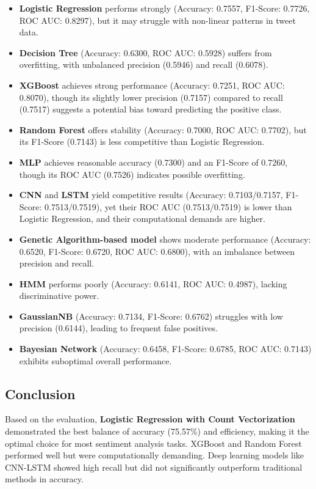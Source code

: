 \begin{itemize}
    \item \textbf{Logistic Regression} performs strongly (Accuracy: 0.7557, F1-Score: 0.7726, ROC AUC: 0.8297), but it may struggle with non-linear patterns in tweet data.
    \item \textbf{Decision Tree} (Accuracy: 0.6300, ROC AUC: 0.5928) suffers from overfitting, with unbalanced precision (0.5946) and recall (0.6078).
    \item \textbf{XGBoost} achieves strong performance (Accuracy: 0.7251, ROC AUC: 0.8070), though its slightly lower precision (0.7157) compared to recall (0.7517) suggests a potential bias toward predicting the positive class.
    \item \textbf{Random Forest} offers stability (Accuracy: 0.7000, ROC AUC: 0.7702), but its F1-Score (0.7143) is less competitive than Logistic Regression.
    \item \textbf{MLP} achieves reasonable accuracy (0.7300) and an F1-Score of 0.7260, though its ROC AUC (0.7526) indicates possible overfitting.
    \item \textbf{CNN} and \textbf{LSTM} yield competitive results (Accuracy: 0.7103/0.7157, F1-Score: 0.7513/0.7519), yet their ROC AUC (0.7513/0.7519) is lower than Logistic Regression, and their computational demands are higher.
    \item \textbf{Genetic Algorithm-based model} shows moderate performance (Accuracy: 0.6520, F1-Score: 0.6720, ROC AUC: 0.6800), with an imbalance between precision and recall.
    \item \textbf{HMM} performs poorly (Accuracy: 0.6141, ROC AUC: 0.4987), lacking discriminative power.
    \item \textbf{GaussianNB} (Accuracy: 0.7134, F1-Score: 0.6762) struggles with low precision (0.6144), leading to frequent false positives.
    \item \textbf{Bayesian Network} (Accuracy: 0.6458, F1-Score: 0.6785, ROC AUC: 0.7143) exhibits suboptimal overall performance.
\end{itemize}

\subsection{Conclusion}

Based on the evaluation, \textbf{Logistic Regression with Count Vectorization} demonstrated the best balance of accuracy (75.57\%) and efficiency, making it the optimal choice for most sentiment analysis tasks. XGBoost and Random Forest performed well but were computationally demanding. Deep learning models like CNN-LSTM showed high recall but did not significantly outperform traditional methods in accuracy.

